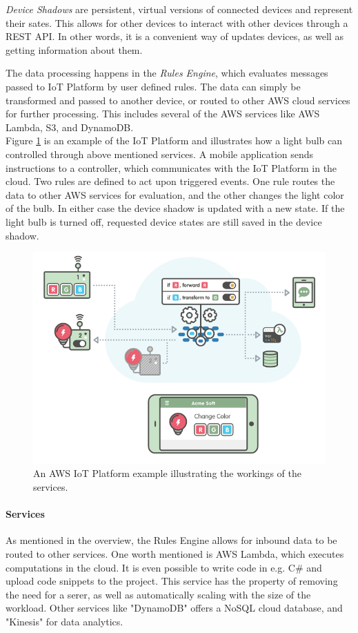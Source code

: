 \textit{Device Shadows} are persistent, virtual versions of connected devices and represent their sates. This allows for other devices to interact with other devices through a REST API. In other words, it is a convenient way of updates devices, as well as getting information about them. 

The data processing happens in the \textit{Rules Engine}, which evaluates messages passed to IoT Platform by user defined rules. The data can simply be transformed and passed to another device, or routed to other AWS cloud services for further processing. This includes several of the AWS services like AWS Lambda, S3, and DynamoDB. \\

Figure \ref{fig:aws:example} is an example of the IoT Platform and illustrates how a light bulb can controlled through above mentioned services. A mobile application sends instructions to a controller, which communicates with the IoT Platform in the cloud. Two rules are defined to act upon triggered events. One rule routes the data to other AWS services for evaluation, and the other changes the light color of the bulb. In either case the device shadow is updated with a new state. If the light bulb is turned off, requested device states are still saved in the device shadow.  
\begin{figure}[h!]
	\centering
	\includegraphics[width=\textwidth]{figures/aws/example.png}
	\caption{An AWS IoT Platform example illustrating the workings of the services.}
	\label{fig:aws:example}
\end{figure}

\paragraph{Services}
As mentioned in the overview, the Rules Engine allows for inbound data to be routed to other services. One worth mentioned is AWS Lambda, which executes computations in the cloud. It is even possible to write code in e.g. C\# and upload code snippets to the project. This service has the property of removing the need for a serer, as well as automatically scaling with the size of the workload. Other services like "DynamoDB" offers a NoSQL cloud database, and "Kinesis" for data analytics.  

